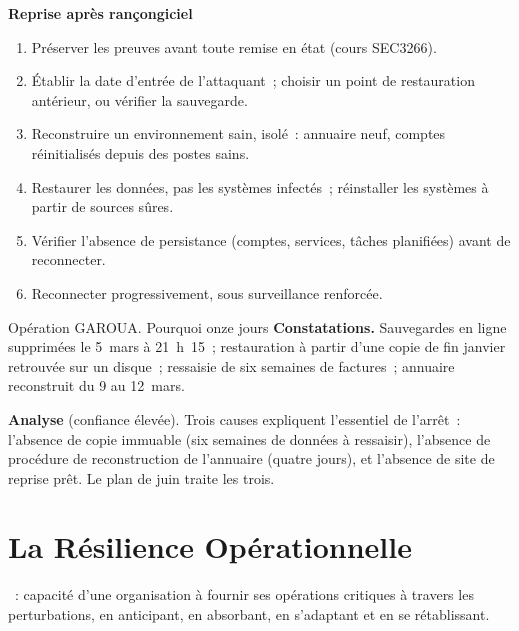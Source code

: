 \begin{boxprocedure}
\textbf{Reprise après rançongiciel}
\begin{enumerate}
    \item Préserver les preuves avant toute remise en état
          (cours SEC3266).
    \item Établir la date d'entrée de l'attaquant~; choisir un point de
          restauration antérieur, ou vérifier la sauvegarde.
    \item Reconstruire un environnement sain, isolé~: annuaire neuf, comptes
          réinitialisés depuis des postes sains.
    \item Restaurer les données, pas les systèmes infectés~; réinstaller les
          systèmes à partir de sources sûres.
    \item Vérifier l'absence de persistance (comptes, services, tâches
          planifiées) avant de reconnecter.
    \item Reconnecter progressivement, sous surveillance renforcée.
\end{enumerate}
\end{boxprocedure}

\begin{boxscenario}{Opération GAROUA. Pourquoi onze jours}
\textbf{Constatations.} Sauvegardes en ligne supprimées le 5~mars à
21~h~15~; restauration à partir d'une copie de fin janvier retrouvée sur un
disque~; ressaisie de six semaines de factures~; annuaire reconstruit du
9 au 12~mars.

\medskip
\textbf{Analyse} (confiance élevée). Trois causes expliquent l'essentiel de
l'arrêt~: l'absence de copie immuable (six semaines de données à
ressaisir), l'absence de procédure de reconstruction de l'annuaire (quatre
jours), et l'absence de site de reprise prêt. Le plan de juin traite les
trois.
\end{boxscenario}

\section{La Résilience Opérationnelle}
\label{sec:c19-resilience}

\begin{boxdef}
~: capacité d'une organisation à
fournir ses opérations critiques à travers les perturbations, en anticipant,
en absorbant, en s'adaptant et en se rétablissant.
\end{boxdef}

